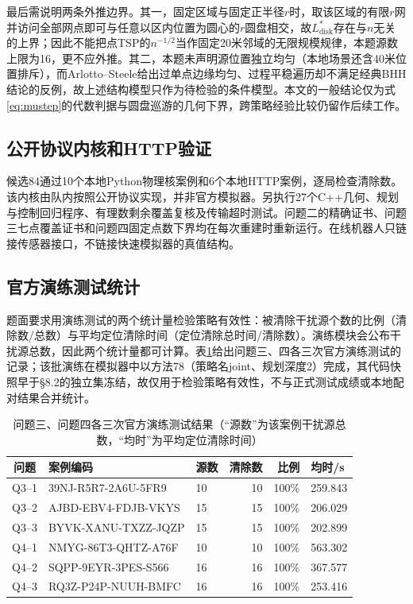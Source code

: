 \documentclass[UTF8,a4paper,zihao=-4,fontset=fandol]{ctexart}
\begin{document}
最后需说明两条外推边界。其一，固定区域与固定正半径$r$时，取该区域的有限$r$网并访问全部网点即可与任意以区内位置为圆心的$r$圆盘相交，故$L^*_{\mathrm{disk}}$存在与$n$无关的上界；因此不能把点TSP的$n^{-1/2}$当作固定20米邻域的无限规模规律，本题源数上限为16，更不应外推。其二，本题未声明源位置独立均匀（本地场景还含40米位置排斥），而Arlotto--Steele给出过单点边缘均匀、过程平稳遍历却不满足经典BHH结论的反例\cite{arlotto}，故上述结构模型只作为待检验的条件模型。本文的一般结论仅为式\eqref{eq:mustep}的代数判据与圆盘巡游的几何下界，跨策略经验比较仍留作后续工作。

\subsection{公开协议内核和HTTP验证}
候选84通过10个本地Python物理核案例和6个本地HTTP案例，逐局检查清除数。该内核由队内按照公开协议实现，并非官方模拟器。另执行27个C++几何、规划与控制回归程序、有理数剩余覆盖复核及传输超时测试。问题二的精确证书、问题三七点覆盖证书和问题四固定点数下界均在每次重建时重新运行。在线机器人只链接传感器接口，不链接快速模拟器的真值结构。

\subsection{官方演练测试统计}
题面要求用演练测试的两个统计量检验策略有效性：被清除干扰源个数的比例（清除数/总数）与平均定位清除时间（定位清除总时间/清除数）。演练模块会公布干扰源总数，因此两个统计量都可计算。表\ref{tab:practice}给出问题三、四各三次官方演练测试的记录；该批演练在模拟器中以方法78（策略名joint、规划深度2）完成，其代码快照早于\S8.2的独立集冻结，故仅用于检验策略有效性，不与正式测试成绩或本地配对结果合并统计。

\begin{table}[!htbp]\centering\small\caption{问题三、问题四各三次官方演练测试结果（“源数”为该案例干扰源总数，“均时”为平均定位清除时间）}\label{tab:practice}
\begin{tabular}{clp{2.85cm}rrp{1.7cm}}\toprule 问题&案例编码&源数&清除数&比例&均时/s\\\midrule
Q3--1&39NJ-R5R7-2A6U-5FR9&10&10&100\%&259.843\\
Q3--2&AJBD-EBV4-FDJB-VKYS&15&15&100\%&206.029\\
Q3--3&BYVK-XANU-TXZZ-JQZP&15&15&100\%&202.899\\
Q4--1&NMYG-86T3-QHTZ-A76F&10&10&100\%&563.302\\
Q4--2&SQPP-9EYR-3PES-S566&16&16&100\%&367.577\\
Q4--3&RQ3Z-P24P-NUUH-BMFC&16&16&100\%&253.416\\\bottomrule\end{tabular}\end{table}
\end{document}
